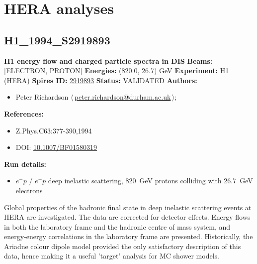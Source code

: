 \clearpage


\section{HERA analyses}\subsection[H1\_1994\_S2919893]{H1\_1994\_S2919893\,\cite{Abt:1994ye}}
\textbf{H1 energy flow and charged particle spectra in DIS}\newline
\textbf{Beams:} [ELECTRON, PROTON] \newline
\textbf{Energies:} (820.0, 26.7) GeV \newline
\textbf{Experiment:} H1 (HERA) \newline
\textbf{Spires ID:} \href{http://www.slac.stanford.edu/spires/find/hep/www?rawcmd=key+2919893}{2919893}\newline
\textbf{Status:} VALIDATED\newline
\textbf{Authors:}
\begin{itemize}
  \item Peter Richardson $\langle\,$\href{mailto:peter.richardson@durham.ac.uk}{peter.richardson@durham.ac.uk}$\,\rangle$;
\end{itemize}
\textbf{References:}
\begin{itemize}
  \item Z.Phys.C63:377-390,1994
  \item DOI: \href{http://dx.doi.org/10.1007/BF01580319}{10.1007/BF01580319}
\end{itemize}
\textbf{Run details:}
\begin{itemize}

  \item $e^- p$ / $e^+ p$ deep inelastic scattering, 820~GeV protons colliding with 26.7~GeV electrons\end{itemize}

\noindent Global properties of the hadronic final state in deep inelastic scattering events at HERA are investigated. The data are corrected for detector effects. Energy flows in both the laboratory frame and the hadronic centre of mass system, and energy-energy correlations in the laboratory frame are presented.  Historically, the Ariadne colour dipole model provided the only satisfactory description of this data, hence making it a useful 'target' analysis for MC shower models.

